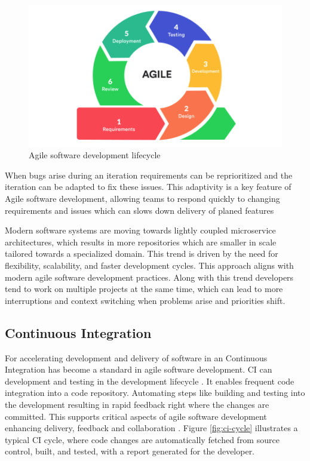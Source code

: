 \begin{figure}[H]
    \centering
    \includegraphics[width=1\textwidth]{images/agile-cycle.png}
    \caption{Agile software development lifecycle}
    \label{fig:agile-cycle}
\end{figure}


When bugs arise during an iteration requirements can be reprioritized and the iteration can be adapted to fix these issues. This adaptivity is a key feature of Agile software development, allowing teams to respond quickly to changing requirements and issues which can slows down delivery of planed features %

Modern software systems are moving towards lightly coupled microservice architectures, which results in more repositories which are smaller in scale tailored towards a specialized domain. This trend is driven by the need for flexibility, scalability, and faster development cycles. This approach aligns with modern agile software development practices. \cite{francescoResearchArchitectingMicroservices2017} Along with this trend developers tend to work on multiple projects at the same time, which can lead to more interruptions and context switching when problems arise and priorities shift. \cite{tregubovImpactTaskSwitching2017, vasilescuSkyNotLimit2016}

\subsection{Continuous Integration}

For accelerating development and delivery of software in an Continuous Integration has become a standard in agile software development. CI can  development and testing in the development lifecycle \cite{ugwuezeContinuousIntegrationDeployment2024}. It enables frequent code integration into a code repository. Automating steps like building and testing into the development resulting in rapid feedback right where the changes are committed. This supports critical aspects of agile software development enhancing delivery, feedback and collaboration  \cite{ugwuezeContinuousIntegrationDeployment2024}. Figure \ref{fig:ci-cycle} illustrates a typical CI cycle, where code changes are automatically fetched from source control, built, and tested, with a report generated for the developer.

